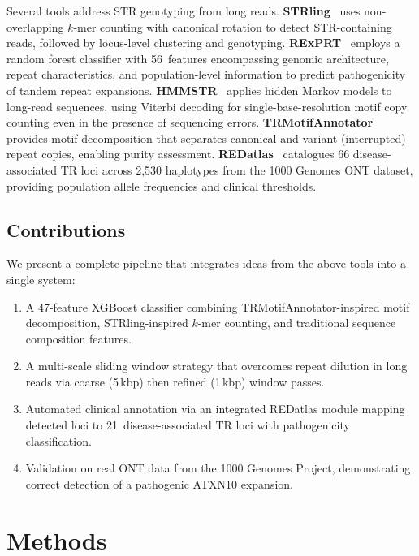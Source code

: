 \documentclass[11pt,twocolumn]{article}
\begin{document}
Several tools address STR genotyping from long reads.
\textbf{STRling}~\citep{dashnow2022} uses non-overlapping $k$-mer
counting with canonical rotation to detect STR-containing reads,
followed by locus-level clustering and genotyping.
\textbf{RExPRT}~\citep{dolzhenko2024} employs a random forest
classifier with 56~features encompassing genomic architecture,
repeat characteristics, and population-level information to predict
pathogenicity of tandem repeat expansions.
\textbf{HMMSTR}~\citep{steely2025} applies hidden Markov models to
long-read sequences, using Viterbi decoding for single-base-resolution
motif copy counting even in the presence of sequencing errors.
\textbf{TRMotifAnnotator}~\citep{wf-trs2025} provides motif
decomposition that separates canonical and variant (interrupted) repeat
copies, enabling purity assessment.
\textbf{REDatlas}~\citep{rajanbabu2025} catalogues 66
disease-associated TR loci across 2{,}530 haplotypes from the 1000
Genomes ONT dataset, providing population allele frequencies and
clinical thresholds.

\subsection{Contributions}

We present a complete pipeline that integrates ideas from the above
tools into a single system:

\begin{enumerate}[nosep]
    \item A 47-feature XGBoost classifier combining TRMotifAnnotator-inspired
          motif decomposition, STRling-inspired $k$-mer counting, and
          traditional sequence composition features.
    \item A multi-scale sliding window strategy that overcomes repeat
          dilution in long reads via coarse (5\,kbp) then refined (1\,kbp)
          window passes.
    \item Automated clinical annotation via an integrated REDatlas
          module mapping detected loci to 21~disease-associated TR loci
          with pathogenicity classification.
    \item Validation on real ONT data from the 1000 Genomes Project,
          demonstrating correct detection of a pathogenic ATXN10
          expansion.
\end{enumerate}

\section{Methods}\label{sec:methods}
\end{document}
